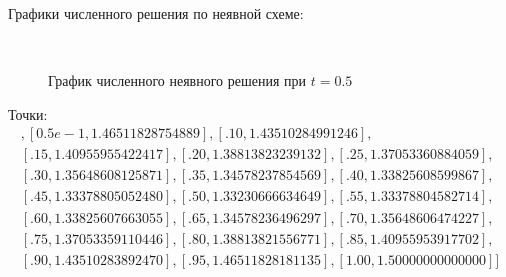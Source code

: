 \documentclass[14pt,a4paper]{scrartcl}
\begin{document}


\pagebreak

Графики численного решения по неявной схеме: 


\begin{figure}[H]
	\begin{minipage}[h]{1\linewidth}
		\\
		\caption{График численного неявного решения при $t=0.5$}
	\end{minipage}
\end{figure}

Точки:
\begin{align*}
[[0., 1.50000000000000], [0.5e-1, 1.46511828754889], [.10, 1.43510284991246],\\
 [.15, 1.40955955422417], [.20, 1.38813823239132], [.25, 1.37053360884059],\\
  [.30, 1.35648608125871], [.35, 1.34578237854569], [.40, 1.33825608599867],\\
   [.45, 1.33378805052480], [.50, 1.33230666634649], [.55, 1.33378804582714],\\
    [.60, 1.33825607663055], [.65, 1.34578236496297], [.70, 1.35648606474227],\\
     [.75, 1.37053359110446], [.80, 1.38813821556771], [.85, 1.40955953917702],\\
      [.90, 1.43510283892470], [.95, 1.46511828181135], [1.00, 1.50000000000000]]
\end{align*}
\end{document}
